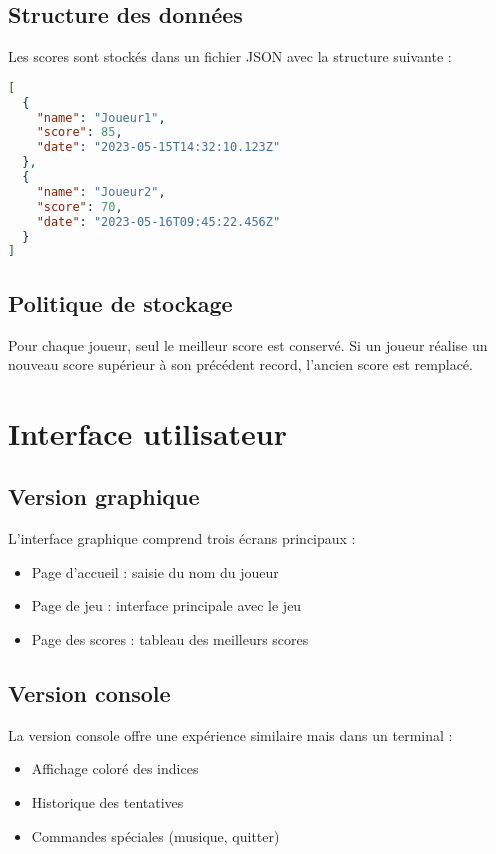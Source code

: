 \documentclass{article}
\begin{document}
\subsection{Structure des données}
Les scores sont stockés dans un fichier JSON avec la structure suivante :
\begin{lstlisting}[language=JSON, caption=Structure du fichier scores.json]
[
  {
    "name": "Joueur1",
    "score": 85,
    "date": "2023-05-15T14:32:10.123Z"
  },
  {
    "name": "Joueur2",
    "score": 70,
    "date": "2023-05-16T09:45:22.456Z"
  }
]
\end{lstlisting}

\subsection{Politique de stockage}
Pour chaque joueur, seul le meilleur score est conservé. Si un joueur réalise un nouveau score supérieur à son précédent record, l'ancien score est remplacé.

\section{Interface utilisateur}

\subsection{Version graphique}
L'interface graphique comprend trois écrans principaux :
\begin{itemize}
    \item Page d'accueil : saisie du nom du joueur
    \item Page de jeu : interface principale avec le jeu
    \item Page des scores : tableau des meilleurs scores
\end{itemize}

\subsection{Version console}
La version console offre une expérience similaire mais dans un terminal :
\begin{itemize}
    \item Affichage coloré des indices
    \item Historique des tentatives
    \item Commandes spéciales (musique, quitter)
\end{itemize}
\end{document}
